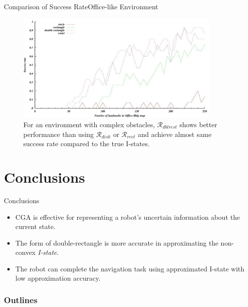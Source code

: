 \begin{frame}{Comparison of Success Rate}{Office-like Environment}
  \begin{figure}
    \includegraphics[width=0.9\textwidth]{figs/rate-office.jpg}
    \caption{For an environment with complex obstacles, $\mathcal{R}_{dblrest}$ shows
      better performance than using $\mathcal{R}_{disk}$ or $\mathcal{R}_{rect}$ and
      achieve almost same success rate compared to the true I-states.}
  \end{figure}
\end{frame}
\section[Conclusions]{Conclusions}
\begin{frame}{Conclusions}
  \begin{itemize}
  \item CGA is effective for representing a robot's uncertain information about
    the current state.
  \item The form of double-rectangle is more accurate in approximating the non-convex
    \emph{I-state}.
  \item The robot can complete the navigation task using approximated I-state with
    low approximation accuracy.
  \end{itemize}
\end{frame}
\begin{frame}
  \frametitle{Outlines}
  \tableofcontents[]
\end{frame}

